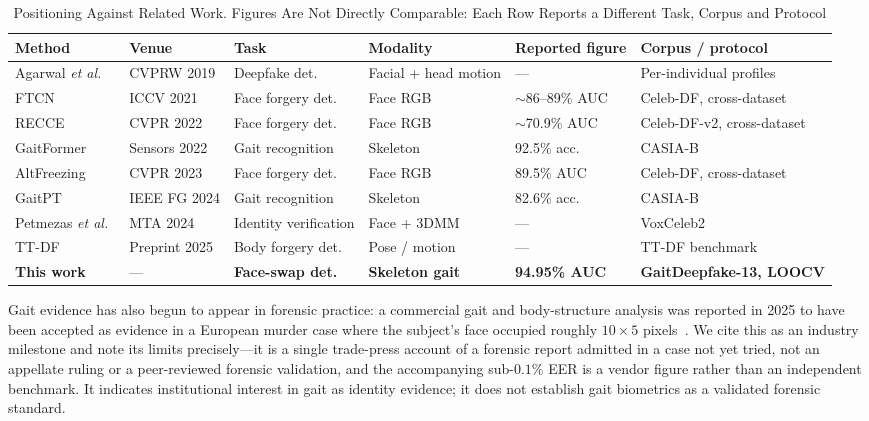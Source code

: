 \documentclass[journal]{IEEEtran}
\newcommand{\tabhead}[1]{\textbf{#1}}
\begin{document}
\begin{table}[!t]
\caption{Positioning Against Related Work. Figures Are Not Directly
Comparable: Each Row Reports a Different Task, Corpus and Protocol}
\label{tab:comparison}
\centering
\small
\begin{tabular}{@{}llllll@{}}
\toprule
\tabhead{Method} & \tabhead{Venue} & \tabhead{Task} & \tabhead{Modality} &
\tabhead{Reported figure} & \tabhead{Corpus / protocol} \\
\midrule
Agarwal \emph{et al.}~\cite{agarwal2019} & CVPRW 2019 & Deepfake det.
  & Facial + head motion & --- & Per-individual profiles \\
FTCN~\cite{ftcn} & ICCV 2021 & Face forgery det.
  & Face RGB & $\sim$86--89\% AUC & Celeb-DF, cross-dataset \\
RECCE~\cite{recce} & CVPR 2022 & Face forgery det.
  & Face RGB & $\sim$70.9\% AUC & Celeb-DF-v2, cross-dataset \\
GaitFormer~\cite{gaitformer} & Sensors 2022 & Gait recognition
  & Skeleton & 92.5\% acc. & CASIA-B \\
AltFreezing~\cite{altfreezing} & CVPR 2023 & Face forgery det.
  & Face RGB & 89.5\% AUC & Celeb-DF, cross-dataset \\
GaitPT~\cite{gaitpt} & IEEE FG 2024 & Gait recognition
  & Skeleton & 82.6\% acc. & CASIA-B \\
Petmezas \emph{et al.}~\cite{hybrid_face} & MTA 2024 & Identity verification
  & Face + 3DMM & --- & VoxCeleb2 \\
TT-DF~\cite{ttdf} & Preprint 2025 & Body forgery det.
  & Pose / motion & --- & TT-DF benchmark \\
\midrule
\textbf{This work} & --- & \textbf{Face-swap det.}
  & \textbf{Skeleton gait} & \textbf{94.95\% AUC}
  & \textbf{GaitDeepfake-13, LOOCV} \\
\bottomrule
\end{tabular}
\end{table}

Gait evidence has also begun to appear in forensic practice: a commercial gait
and body-structure analysis was reported in 2025 to have been accepted as
evidence in a European murder case where the subject's face occupied roughly
$10 \times 5$ pixels~\cite{forensic_gait}. We cite this as an industry
milestone and note its limits precisely---it is a single trade-press account of
a forensic report admitted in a case not yet tried, not an appellate ruling or
a peer-reviewed forensic validation, and the accompanying sub-$0.1\%$ EER is a
vendor figure rather than an independent benchmark. It indicates institutional
interest in gait as identity evidence; it does not establish gait biometrics as
a validated forensic standard.
\end{document}
